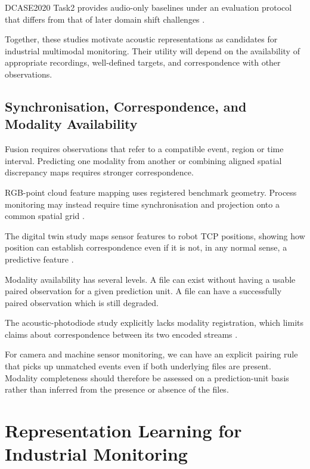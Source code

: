 DCASE2020 Task2 provides audio-only baselines under an evaluation protocol that differs from that of
later domain shift challenges \parencite{koizumi_description_2020}.

Together, these studies motivate acoustic representations as candidates for industrial multimodal
monitoring. Their utility will depend on the availability of appropriate recordings, well-defined
targets, and correspondence with other observations.

\subsection{Synchronisation, Correspondence, and Modality Availability}

Fusion requires observations that refer to a compatible event, region or time interval. Predicting
one modality from another or combining aligned spatial discrepancy maps requires stronger
correspondence.

RGB-point cloud feature mapping uses registered benchmark geometry. Process monitoring may instead
require time synchronisation and projection onto a common spatial grid
\parencite{costanzino_multimodal_2024,petrich_multi-modal_2021}.

The digital twin study maps sensor features to robot TCP positions, showing how position can
establish correspondence even if it is not, in any normal sense, a predictive feature
\parencite{chen_multisensor_2023}.

Modality availability has several levels. A file can exist without having a usable paired
observation for a given prediction unit. A file can have a successfully paired observation which is
still degraded.

The acoustic-photodiode study explicitly lacks modality registration, which limits claims about
correspondence between its two encoded streams \parencite{li_feature-level_2022}.

For camera and machine sensor monitoring, we can have an explicit pairing rule that picks up
unmatched events even if both underlying files are present. Modality completeness should therefore
be assessed on a prediction-unit basis rather than inferred from the presence or absence of the
files.

\section{Representation Learning for Industrial Monitoring}

